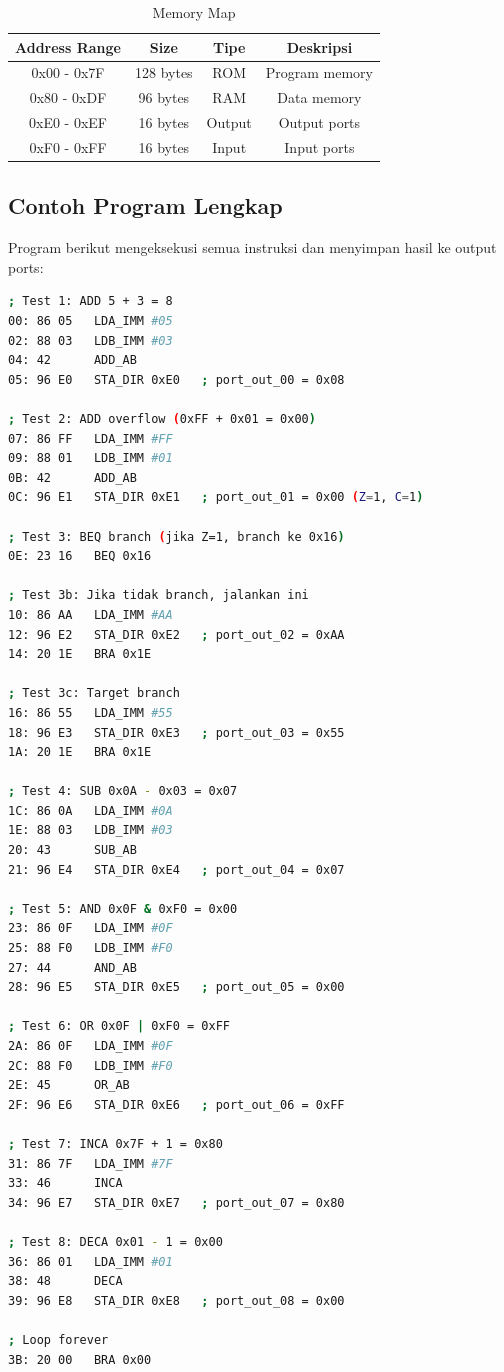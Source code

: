 \documentclass[12pt,a4paper]{report}
\begin{document}
\begin{table}[H]
  \centering
  \small
  \begin{tabular}{|c|c|c|c|}
    \hline
    \textbf{Address Range} & \textbf{Size} & \textbf{Tipe} & \textbf{Deskripsi} \\
    \hline
    0x00 - 0x7F & 128 bytes & ROM & Program memory \\
    0x80 - 0xDF & 96 bytes & RAM & Data memory \\
    0xE0 - 0xEF & 16 bytes & Output & Output ports \\
    0xF0 - 0xFF & 16 bytes & Input & Input ports \\
    \hline
  \end{tabular}
  \caption{Memory Map}
\end{table}

\subsection{Contoh Program Lengkap}

Program berikut mengeksekusi semua instruksi dan menyimpan hasil ke output ports:

\begin{lstlisting}[language=bash]
; Test 1: ADD 5 + 3 = 8
00: 86 05   LDA_IMM #05
02: 88 03   LDB_IMM #03
04: 42      ADD_AB
05: 96 E0   STA_DIR 0xE0   ; port_out_00 = 0x08

; Test 2: ADD overflow (0xFF + 0x01 = 0x00)
07: 86 FF   LDA_IMM #FF
09: 88 01   LDB_IMM #01
0B: 42      ADD_AB
0C: 96 E1   STA_DIR 0xE1   ; port_out_01 = 0x00 (Z=1, C=1)

; Test 3: BEQ branch (jika Z=1, branch ke 0x16)
0E: 23 16   BEQ 0x16

; Test 3b: Jika tidak branch, jalankan ini
10: 86 AA   LDA_IMM #AA
12: 96 E2   STA_DIR 0xE2   ; port_out_02 = 0xAA
14: 20 1E   BRA 0x1E

; Test 3c: Target branch
16: 86 55   LDA_IMM #55
18: 96 E3   STA_DIR 0xE3   ; port_out_03 = 0x55
1A: 20 1E   BRA 0x1E

; Test 4: SUB 0x0A - 0x03 = 0x07
1C: 86 0A   LDA_IMM #0A
1E: 88 03   LDB_IMM #03
20: 43      SUB_AB
21: 96 E4   STA_DIR 0xE4   ; port_out_04 = 0x07

; Test 5: AND 0x0F & 0xF0 = 0x00
23: 86 0F   LDA_IMM #0F
25: 88 F0   LDB_IMM #F0
27: 44      AND_AB
28: 96 E5   STA_DIR 0xE5   ; port_out_05 = 0x00

; Test 6: OR 0x0F | 0xF0 = 0xFF
2A: 86 0F   LDA_IMM #0F
2C: 88 F0   LDB_IMM #F0
2E: 45      OR_AB
2F: 96 E6   STA_DIR 0xE6   ; port_out_06 = 0xFF

; Test 7: INCA 0x7F + 1 = 0x80
31: 86 7F   LDA_IMM #7F
33: 46      INCA
34: 96 E7   STA_DIR 0xE7   ; port_out_07 = 0x80

; Test 8: DECA 0x01 - 1 = 0x00
36: 86 01   LDA_IMM #01
38: 48      DECA
39: 96 E8   STA_DIR 0xE8   ; port_out_08 = 0x00

; Loop forever
3B: 20 00   BRA 0x00
\end{lstlisting}
\end{document}
